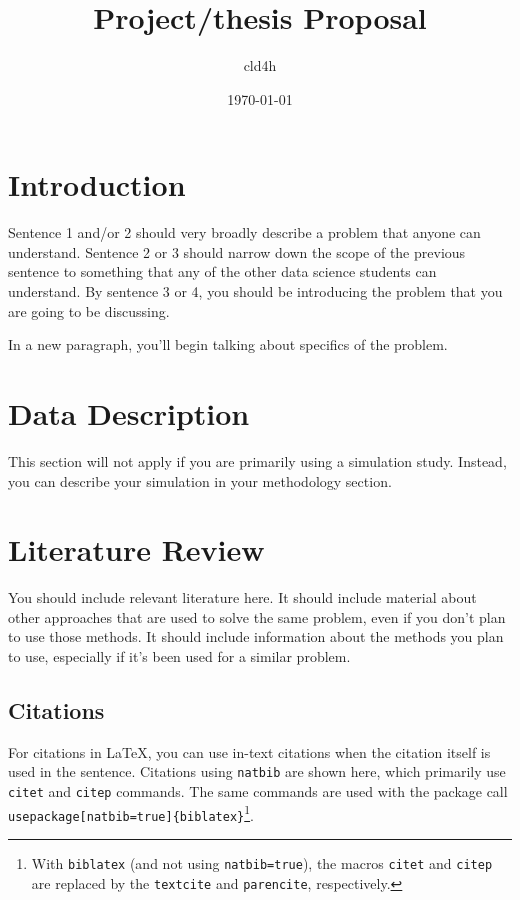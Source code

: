 \documentclass[12pt]{article}
\title{Project/thesis Proposal}
\author{cld4h}
\date{\today}
\begin{document}
	
	\maketitle
	
	
	\section{Introduction}
	Sentence 1 and/or 2 should very broadly describe a problem that anyone can understand. Sentence 2 or 3 should narrow down the scope of the previous sentence to something that any of the other data science students can understand. By sentence 3 or 4, you should be introducing the problem that you are going to be discussing.
	
	In a new paragraph, you'll begin talking about specifics of the problem.
	
	\section{Data Description}
	
	This section will not apply if you are primarily using a simulation study. Instead, you can describe your simulation in your methodology section. 
	\section{Literature Review}
	
	You should include relevant literature here. It should include material about other approaches that are used to solve the same problem, even if you don't plan to use those methods. It should include information about the methods you plan to use, especially if it's been used for a similar problem.
	
	\subsection{Citations}
	For citations in \LaTeX, you can use in-text citations when the citation itself is used in the sentence. Citations using \texttt{natbib} are shown here, which primarily use \texttt{citet} and \texttt{citep} commands. The same commands are used with the package call \texttt{\\usepackage[natbib=true]\{biblatex\}}\footnote{With \texttt{biblatex} (and not using \texttt{natbib=true}), the macros \texttt{citet} and \texttt{citep} are replaced by the \texttt{textcite} and \texttt{parencite}, respectively.}.
	
\end{document}
